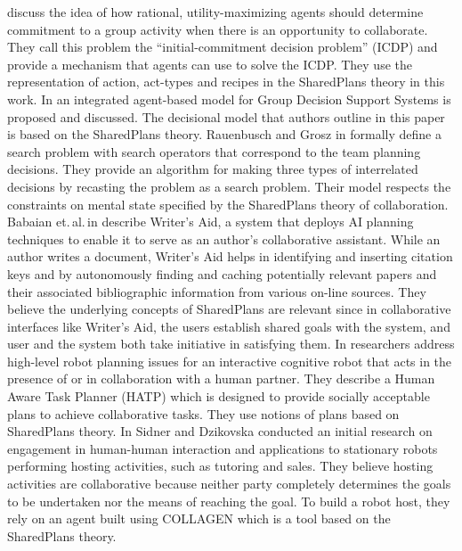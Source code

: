 \documentclass[12pt]{report}
\begin{document}
discuss the idea of how rational, utility-maximizing agents should determine
commitment to a group activity when there is an opportunity to collaborate. They
call this problem the ``initial-commitment decision problem'' (ICDP) and provide
a mechanism that agents can use to solve the ICDP. They use the representation
of action, act-types and recipes in the SharedPlans theory in this work. In
\cite{zamfirescu:gdss} an integrated agent-based model for Group Decision
Support Systems is proposed and discussed. The decisional model that authors
outline in this paper is based on the SharedPlans theory. Rauenbusch and Grosz
in \cite{rauenbusch:decision-making-planning} formally define a search problem
with search operators that correspond to the team planning decisions. They
provide an algorithm for making three types of interrelated decisions by
recasting the problem as a search problem. Their model respects the constraints
on mental state specified by the SharedPlans theory of collaboration. Babaian
et.\,al.\,in \cite{babaian:writers-assistant} describe Writer's Aid, a system
that deploys AI planning techniques to enable it to serve as an author's
collaborative assistant. While an author writes a document, Writer's Aid helps
in identifying and inserting citation keys and by autonomously finding and
caching potentially relevant papers and their associated bibliographic
information from various on-line sources. They believe the underlying concepts
of SharedPlans are relevant since in collaborative interfaces like Writer’s Aid,
the users establish shared goals with the system, and user and the system both
take initiative in satisfying them. In \cite{montreuil:planning-robot-activity}
researchers address high-level robot planning issues for an interactive
cognitive robot that acts in the presence of or in collaboration with a human
partner. They describe a Human Aware Task Planner (HATP) which is designed to
provide socially acceptable plans to achieve collaborative tasks. They use
notions of plans based on SharedPlans theory. In \cite{sidner:enagagement-robot}
Sidner and Dzikovska conducted an initial research on engagement in human-human
interaction and applications to stationary robots performing hosting activities,
such as tutoring and sales. They believe hosting activities are collaborative
because neither party completely determines the goals to be undertaken nor the
means of reaching the goal. To build a robot host, they rely on an agent built
using COLLAGEN which is a tool based on the SharedPlans theory.\\
\end{document}
